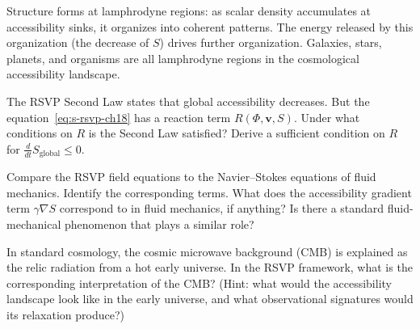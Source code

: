 Structure forms at lamphrodyne regions: as scalar density accumulates
at accessibility sinks, it organizes into coherent patterns. The energy
released by this organization (the decrease of $S$) drives further
organization. Galaxies, stars, planets, and organisms are all lamphrodyne
regions in the cosmological accessibility landscape.

\begin{exercise}
  The RSVP Second Law states that global accessibility decreases.
  But the equation~\eqref{eq:s-rsvp-ch18} has a reaction term $R(\Phi,\mathbf{v},S)$.
  Under what conditions on $R$ is the Second Law satisfied? Derive a
  sufficient condition on $R$ for $\frac{d}{dt} S_\text{global} \leq 0$.
\end{exercise}

\begin{exercise}
  Compare the RSVP field equations to the Navier–Stokes equations of
  fluid mechanics. Identify the corresponding terms. What does the
  accessibility gradient term $\gamma \nabla S$ correspond to in fluid
  mechanics, if anything? Is there a standard fluid-mechanical phenomenon
  that plays a similar role?
\end{exercise}

\begin{exercise}[title={Cosmological}]
  In standard cosmology, the cosmic microwave background (CMB) is explained
  as the relic radiation from a hot early universe. In the RSVP framework,
  what is the corresponding interpretation of the CMB? (Hint: what would
  the accessibility landscape look like in the early universe, and what
  observational signatures would its relaxation produce?)
\end{exercise}
